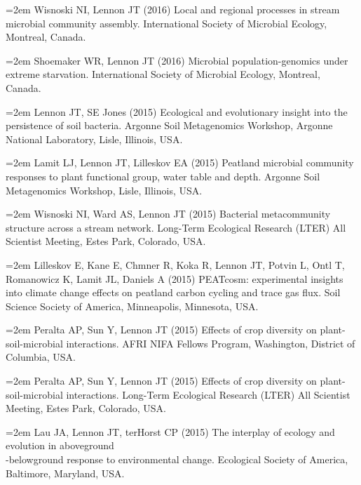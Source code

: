 \documentclass[11pt]{article}
\begin{document}
{\hangindent=2em Wisnoski NI, Lennon JT (2016) Local and regional processes in stream microbial community assembly. International Society of Microbial Ecology, Montreal, Canada. \par

\hangindent=2em Shoemaker WR, Lennon JT (2016) Microbial population-genomics under extreme starvation. International Society of Microbial Ecology, Montreal, Canada. \par

\hangindent=2em Lennon JT, SE Jones (2015) Ecological and evolutionary insight into the persistence of soil bacteria. Argonne Soil Metagenomics Workshop, Argonne National Laboratory, Lisle, Illinois, USA. \par

\hangindent=2em Lamit LJ, Lennon JT, Lilleskov EA (2015) Peatland microbial community responses to plant functional group, water table and depth. Argonne Soil Metagenomics Workshop, Lisle, Illinois, USA. \par

\hangindent=2em Wisnoski NI, Ward AS, Lennon JT (2015) Bacterial metacommunity structure across a stream network. Long-Term Ecological Research (LTER) All Scientist Meeting, Estes Park, Colorado, USA. \par

\hangindent=2em Lilleskov E, Kane E, Chmner R, Koka R, Lennon JT, Potvin L, Ontl T, Romanowicz K, Lamit JL, Daniels A (2015) PEATcosm: experimental insights into climate change effects on peatland carbon cycling and trace gas flux. Soil Science Society of America, Minneapolis, Minnesota, USA. \par

\hangindent=2em Peralta AP, Sun Y, Lennon JT (2015) Effects of crop diversity on plant-soil-microbial interactions. AFRI NIFA Fellows Program, Washington, District of Columbia, USA. \par

\hangindent=2em Peralta AP, Sun Y, Lennon JT (2015) Effects of crop diversity on plant-soil-microbial interactions. Long-Term Ecological Research (LTER) All Scientist Meeting, Estes Park, Colorado, USA. \par

\hangindent=2em Lau JA, Lennon JT, terHorst CP (2015) The interplay of ecology and evolution in aboveground\\-belowground response to environmental change. Ecological Society of America, Baltimore, Maryland, USA. \par

}
\end{document}
